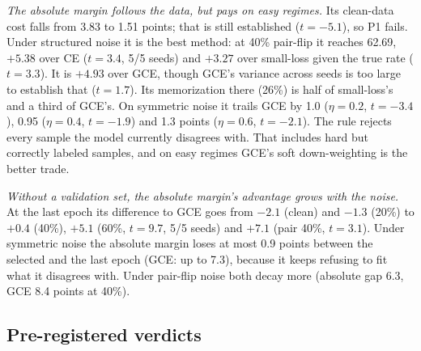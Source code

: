 \emph{The absolute margin follows the data, but pays on easy regimes.} Its clean-data cost falls
from 3.83 to 1.51 points; that is still established ($t = -5.1$), so P1 fails. Under structured
noise it is the best method: at 40\% pair-flip it reaches 62.69, $+5.38$ over CE ($t = 3.4$, 5/5
seeds) and $+3.27$ over small-loss given the true rate ($t = 3.3$). It is $+4.93$ over GCE, though
GCE's variance across seeds is too large to establish that ($t = 1.7$). Its memorization there
(26\%) is half of small-loss's and a third of GCE's. On symmetric noise it trails GCE by 1.0
($\eta = 0.2$, $t = -3.4$), 0.95 ($\eta = 0.4$, $t = -1.9$) and 1.3 points ($\eta = 0.6$,
$t = -2.1$). The rule rejects every sample the model currently disagrees with. That includes hard
but correctly labeled samples, and on easy regimes GCE's soft down-weighting is the better trade.

\emph{Without a validation set, the absolute margin's advantage grows with the noise.} At the last
epoch its difference to GCE goes from $-2.1$ (clean) and $-1.3$ (20\%) to $+0.4$ (40\%),
$+5.1$ (60\%, $t = 9.7$, 5/5 seeds) and $+7.1$ (pair 40\%, $t = 3.1$). Under symmetric noise the
absolute margin loses at most 0.9 points between the selected and the last epoch (GCE: up to 7.3),
because it keeps refusing to fit what it disagrees with. Under pair-flip noise both decay more
(absolute gap 6.3, GCE 8.4 points at 40\%).

\subsection{Pre-registered verdicts}

